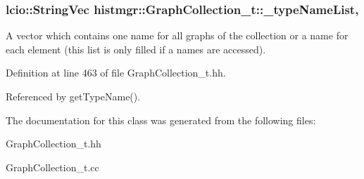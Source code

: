 \subsubsection[{\-\_\-type\-Name\-List}]{\setlength{\rightskip}{0pt plus 5cm}lcio\-::\-String\-Vec histmgr\-::\-Graph\-Collection\-\_\-t\-::\-\_\-type\-Name\-List\hspace{0.3cm}{\ttfamily [mutable]}, {\ttfamily [private]}}\label{classhistmgr_1_1GraphCollection__t_a17189e48d52996372e1fd52c558fbb4a}


A vector which contains one name for all graphs of the collection or a name for each element (this list is only filled if a names are accessed). 



Definition at line 463 of file Graph\-Collection\-\_\-t.\-hh.



Referenced by get\-Type\-Name().



The documentation for this class was generated from the following files\-:\begin{DoxyCompactItemize}
\item 
Graph\-Collection\-\_\-t.\-hh\item 
Graph\-Collection\-\_\-t.\-cc\end{DoxyCompactItemize}
